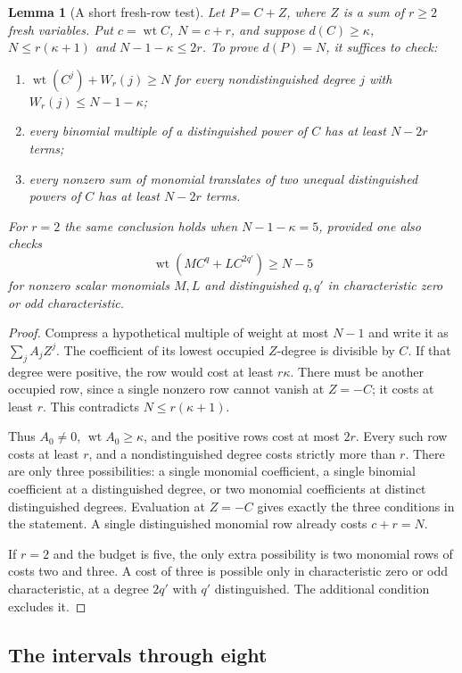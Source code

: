 \documentclass[11pt]{article}
\DeclareMathOperator{\wt}{wt}\DeclareMathOperator{\ord}{ord}
\numberwithin{equation}{section}
\newtheorem{lemma}[theorem]{Lemma}
\theoremstyle{definition}\newtheorem{definition}[theorem]{Definition}
\theoremstyle{remark}\newtheorem{remark}[theorem]{Remark}
\begin{document}
\begin{lemma}[A short fresh-row test]\label{lem:short-fresh-test}
Let $P=C+Z$, where $Z$ is a sum of $r\ge2$ fresh variables.
Put $c=\wt C$, $N=c+r$, and suppose $d(C)\ge\kappa$,
$N\le r(\kappa+1)$ and $N-1-\kappa\le2r$.
To prove $d(P)=N$, it suffices to check:
\begin{enumerate}
 \item $\wt(C^j)+W_r(j)\ge N$ for every nondistinguished degree
 $j$ with $W_r(j)\le N-1-\kappa$;
 \item every binomial multiple of a distinguished power of $C$
 has at least $N-2r$ terms;
 \item every nonzero sum of monomial translates of two unequal
 distinguished powers of $C$ has at least $N-2r$ terms.
\end{enumerate}
For $r=2$ the same conclusion holds when $N-1-\kappa=5$,
provided one also checks
\[
 \wt(MC^q+LC^{2q'})\ge N-5
\]
for nonzero scalar monomials $M,L$ and distinguished $q,q'$
in characteristic zero or odd characteristic.
\end{lemma}
\begin{proof}
Compress a hypothetical multiple of weight at most $N-1$ and
write it as $\sum_j A_jZ^j$. The coefficient of its lowest occupied
$Z$-degree is divisible by $C$. If that degree were positive, the row would
cost at least $r\kappa$. There must be another occupied row,
since a single nonzero row cannot vanish at $Z=-C$; it costs
at least $r$. This contradicts $N\le r(\kappa+1)$.

Thus $A_0\ne0$, $\wt A_0\ge\kappa$, and the positive rows
cost at most $2r$. Every such row costs at least $r$, and a
nondistinguished degree costs strictly more than $r$.
There are only three possibilities: a single monomial
coefficient, a single binomial coefficient at a distinguished
degree, or two monomial coefficients at distinct distinguished
degrees. Evaluation at $Z=-C$ gives exactly the three
conditions in the statement. A single distinguished monomial
row already costs $c+r=N$.

If $r=2$ and the budget is five, the only extra possibility is
two monomial rows of costs two and three. A cost of three is
possible only in characteristic zero or odd characteristic,
at a degree $2q'$ with $q'$ distinguished. The additional
condition excludes it.
\end{proof}

\subsection{The intervals through eight}
\end{document}
